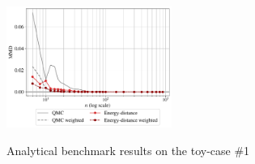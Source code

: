 \begin{figure}[!h]
\begin{center}
    \includegraphics[width=0.48\textwidth]{part2/figures/DCE/analytical_bench/Gaussian Mixture_convergence_MMD_ED.pdf}\\
\end{center}
\caption{Analytical benchmark results on the toy-case \#1} \label{fig:toy-case1}
\end{figure}

